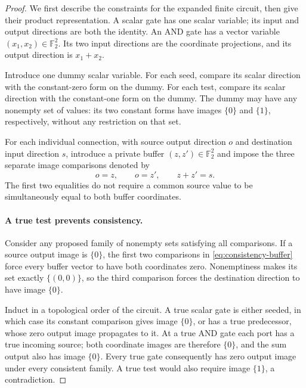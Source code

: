 \documentclass[11pt]{article}
\theoremstyle{definition}
\newcommand{\F}{\mathbb F_2}
\begin{document}
\begin{proof}
We first describe the constraints for the expanded finite circuit, then
give their product representation. A scalar gate has one scalar variable;
its input and output directions are both the identity. An AND gate has
a vector variable $(x_1,x_2)\in\F^2$. Its two input directions are the
coordinate projections, and its output direction is $x_1+x_2$.

Introduce one dummy scalar variable. For each seed, compare its scalar
direction with the constant-zero form on the dummy. For each test, compare
its scalar direction with the constant-one form on the dummy. The dummy
may have any nonempty set of values: its two constant forms have images
$\{0\}$ and $\{1\}$, respectively, without any restriction on that set.

For each individual connection, with source output direction $o$ and
destination input direction $s$, introduce a private buffer
$(z,z')\in\F^2$ and impose the three separate image comparisons denoted by
\begin{equation}\label{eq:consistency-buffer}
 o=z,\qquad o=z',\qquad z+z'=s.
\end{equation}
The first two equalities do not require a common source value to be
simultaneously equal to both buffer coordinates.

\paragraph{A true test prevents consistency.}
Consider any proposed family of nonempty sets satisfying all comparisons.
If a source output image is $\{0\}$, the first two comparisons in
\eqref{eq:consistency-buffer} force every buffer vector to have both
coordinates zero. Nonemptiness makes its set exactly $\{(0,0)\}$, so
the third comparison forces the destination direction to have image
$\{0\}$.

Induct in a topological order of the circuit. A true scalar gate is either
seeded, in which case its constant comparison gives image $\{0\}$, or
has a true predecessor, whose zero output image propagates to it. At a
true AND gate each port has a true incoming source; both coordinate images
are therefore $\{0\}$, and the sum output also has image $\{0\}$.
Every true gate consequently has zero output image under every consistent
family. A true test would also require image $\{1\}$, a contradiction.


\end{proof}
\end{document}

